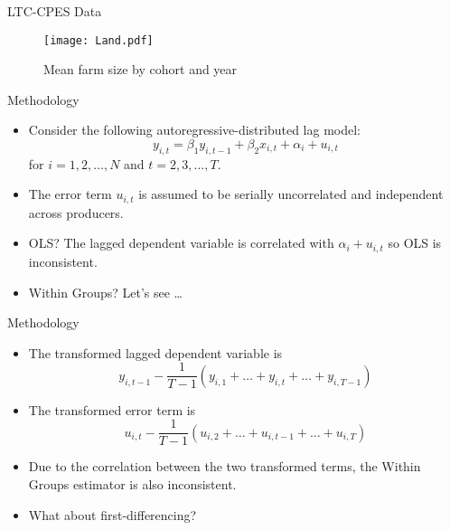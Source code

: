 \documentclass[xcolor=dvipsnames]{beamer}
\begin{document}
\begin{frame}{LTC-CPES Data}
\begin{figure}[htb]
    \centering
     \texttt{[image: Land.pdf]}
     \caption{Mean farm size by cohort and year}
\end{figure}
\end{frame}

\begin{frame}{Methodology}
\begin{itemize}
\item Consider the following autoregressive-distributed lag model: 
\begin{equation*}
y_{i,t} = \beta_1 y_{i,t-1} + \beta_2 x_{i,t} + \alpha_i +  u_{i,t}
\end{equation*}
for $i=1,2,\ldots, N$ and $t=2,3,\ldots,T$.
\par\pause\noindent \item The error term $u_{i,t}$ is assumed to be serially 
uncorrelated and independent across producers.
\par\pause\noindent \item OLS? The lagged dependent variable is correlated 
with $\alpha_i +  u_{i,t}$ so OLS is inconsistent.
\par\pause\noindent \item Within Groups? Let's see \ldots 
\end{itemize}
\end{frame}

\begin{frame}{Methodology}
\begin{itemize}
\item The transformed lagged dependent variable is
\begin{equation*}
y_{i,t-1} - \frac{1}{T-1}(y_{i,1} + \ldots + y_{i,t} + \ldots + y_{i,T-1})
\end{equation*}
\par\pause\noindent \item The transformed error term is
\begin{equation*}
u_{i,t} - \frac{1}{T-1}(u_{i,2} + \ldots + u_{i,t-1} + \ldots + u_{i,T})
\end{equation*}
\par\pause\noindent \item Due to the correlation between the two 
transformed terms, the Within Groups estimator is also inconsistent.
\par\pause\noindent \item What about first-differencing?
\end{itemize}
\end{frame}
\end{document}
